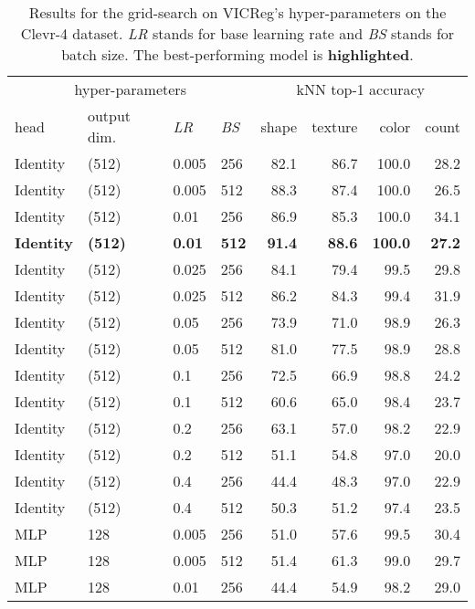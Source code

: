 \begin{table}[]
    \centering
    \caption{Results for the grid-search on VICReg's hyper-parameters on the Clevr-4 dataset. \textit{LR} stands for base learning rate and \textit{BS} stands for batch size. The best-performing model is \textbf{highlighted}.}
    \label{tab:tuning_vicreg}
    \vskip 0.15in
    \begin{tabular}{llll rrrr}
        \toprule
        \multicolumn{4}{c}{hyper-parameters} & \multicolumn{4}{c}{kNN top-1 accuracy} \\ 
        head & output dim. & \textit{LR} & \textit{BS} & shape & texture & color & count \\
        \midrule 
        Identity & (512) & 0.005 & 256 & 82.1 & 86.7 & 100.0 & 28.2 \\
        Identity & (512) & 0.005 & 512 & 88.3 & 87.4 & 100.0 & 26.5 \\
        Identity & (512) & 0.01 & 256 & 86.9 & 85.3 & 100.0 & 34.1 \\
        \textbf{Identity} &  \textbf{(512)} & \textbf{0.01} & \textbf{512} & \textbf{91.4} & \textbf{88.6} & \textbf{100.0} & \textbf{27.2} \\
        Identity & (512) & 0.025 & 256 & 84.1 & 79.4 & 99.5 & 29.8 \\
        Identity & (512) & 0.025 & 512 & 86.2 & 84.3 & 99.4 & 31.9 \\
        Identity & (512) & 0.05 & 256 & 73.9 & 71.0 & 98.9 & 26.3 \\
        Identity & (512) & 0.05 & 512 & 81.0 & 77.5 & 98.9 & 28.8 \\
        Identity & (512) & 0.1 & 256 & 72.5 & 66.9 & 98.8 & 24.2 \\
        Identity & (512) & 0.1 & 512 & 60.6 & 65.0 & 98.4 & 23.7 \\
        Identity & (512) & 0.2 & 256 & 63.1 & 57.0 & 98.2 & 22.9 \\
        Identity & (512) & 0.2 & 512 & 51.1 & 54.8 & 97.0 & 20.0 \\
        Identity & (512) & 0.4 & 256 & 44.4 & 48.3 & 97.0 & 22.9 \\
        Identity & (512) & 0.4 & 512 & 50.3 & 51.2 & 97.4 & 23.5 \\
        MLP & 128 & 0.005 & 256 & 51.0 & 57.6 & 99.5 & 30.4 \\
        MLP & 128 & 0.005 & 512 & 51.4 & 61.3 & 99.0 & 29.7 \\
        MLP & 128 & 0.01 & 256 & 44.4 & 54.9 & 98.2 & 29.0 \\

\end{tabular}
\end{table}
